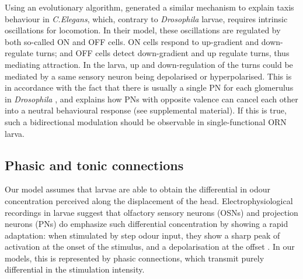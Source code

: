 \documentclass[11pt,a4paper]{article}
\newcommand{\Dros }{\emph{Drosophila }}
\newcommand{\todoAW}[1]{\todo[author=AW,color=green, size=\tiny,inline]{1}}
\newcommand{\todoBW}[1]{\todo[author=BW,color=orange, size=\tiny,inline]{1}}
\begin{document}
Using an evolutionary algorithm, \cite{izquierdo2010evolution} generated a similar mechanism to explain taxis behaviour in {\it C.Elegans}, which, contrary to \Dros larvae, requires intrinsic oscillations for locomotion. In their model, these oscillations are regulated by both so-called ON and OFF cells. ON cells respond to up-gradient and down-regulate turns; and OFF cells detect down-gradient and up regulate turns, thus mediating attraction. In the larva, up and down-regulation of the turns could be mediated by a same sensory neuron being depolarised or hyperpolarised. This is in accordance with the fact that there is usually a single PN for each glomerulus in \Dros \citep{ramaekers2005glomerular} %
 , and explains how PNs with opposite valence can cancel each other into a neutral behavioural response (see supplemental material). If this is true, such a bidirectional modulation should be observable in single-functional ORN larva. 
  
\subsection{Phasic and tonic connections}
Our model assumes that larvae are able to obtain the differential in odour concentration perceived along the displacement of the head. Electrophysiological recordings in larvae suggest that olfactory sensory neurons (OSNs) \citep{nagel2011biophysical,schulze2015dynamical} and projection neurons (PNs) do emphasize such differential concentration by showing a rapid adaptation: when stimulated by step odour input, they show a sharp peak of activation at the onset of the stimulus, and a depolarisation at the offset \citep{schulze2015dynamical}. In our models, this is represented by phasic connections, which transmit purely differential in the stimulation intensity.  
\todoBW{phrasing}
\end{document}
